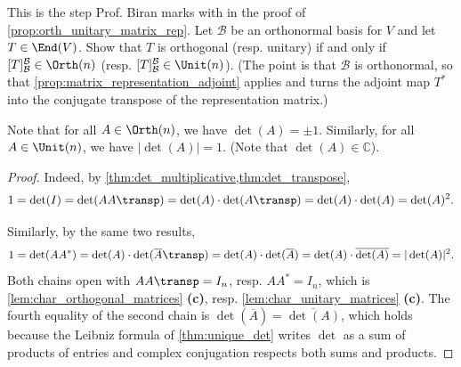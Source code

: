 \begin{exercise}
\label{exc:orth_unitary_matrix_rep}
This is the step Prof. Biran marks with  in the proof of \cref{prop:orth_unitary_matrix_rep}. Let $\mathcal{B}$ be an orthonormal basis for $V$ and let $T \in \End(V)$. Show that $T$ is orthogonal (resp. unitary) if and only if $[T]_{\mathcal{B}}^{\mathcal{B}} \in \Orth(n)$ (resp. $[T]_{\mathcal{B}}^{\mathcal{B}} \in \Unit(n)$). (The point is that $\mathcal{B}$ is orthonormal, so that \cref{prop:matrix_representation_adjoint} applies and turns the adjoint map $T^*$ into the conjugate transpose of the representation matrix.)
\end{exercise}

\begin{proposition*}
\label{prop:det_orth_unit_matrices}
Note that for all $A \in \Orth(n)$, we have $\det(A) = \pm 1$. Similarly, for all $A \in \Unit(n)$, we have $|\det(A)| = 1$. (Note that $\det(A) \in \mathbb{C}$).
\end{proposition*}

\begin{proof}
Indeed, by \cref{thm:det_multiplicative,thm:det_transpose},
\[ 1 = \det(I) = \det(AA\transp) = \det(A) \cdot \det(A\transp) = \det(A) \cdot \det(A) = \det(A)^2. \]

Similarly, by the same two results,
\[ 1 = \det(AA^*) = \det(A) \cdot \det(\overline{A}\transp) = \det(A) \cdot \det(\overline{A}) = \det(A) \cdot \overline{\det(A)} = |\det(A)|^2. \]
Both chains open with $A A\transp = I_n$, resp. $A A^* = I_n$, which is \cref{lem:char_orthogonal_matrices} \textbf{(c)}, resp. \cref{lem:char_unitary_matrices} \textbf{(c)}. The fourth equality of the second chain is $\det(\overline{A}) = \overline{\det(A)}$, which holds because the Leibniz formula of \cref{thm:unique_det} writes $\det$ as a sum of products of entries and complex conjugation respects both sums and products.
\end{proof}

